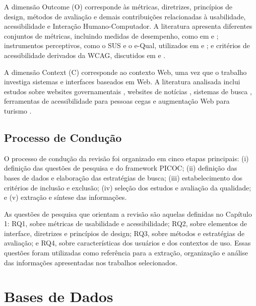 A dimensão Outcome (O) corresponde às métricas, diretrizes, princípios de design, métodos de avaliação e demais contribuições relacionadas à usabilidade, acessibilidade e Interação Humano-Computador. A literatura apresenta diferentes conjuntos de métricas, incluindo medidas de desempenho, como em \cite{weighted_heuristic} e \cite{gatsou2017seniors}; instrumentos perceptivos, como o SUS e o e-Qual, utilizados em \cite{allah2021empathy} e \cite{nosseir2011novice}; e critérios de acessibilidade derivados da WCAG, discutidos em \cite{sun2010preliminary} e \cite{wickramathilaka2023addressing}.

A dimensão Context (C) corresponde ao contexto Web, uma vez que o trabalho investiga sistemas e interfaces baseados em Web. A literatura analisada inclui estudos sobre websites governamentais \cite{health_problem_solving}, websites de notícias \cite{ko2019old}, sistemas de busca \cite{shafiq2018assessment}, ferramentas de acessibilidade para pessoas cegas \cite{kusumaningayu2017web} e augmentação Web para turismo \cite{gonzalez2025augmenting}.



\subsection{Processo de Condução}

\label{sec:conducao}

O processo de condução da revisão foi organizado em cinco etapas principais: (i) definição das questões de pesquisa e do framework PICOC; (ii) definição das bases de dados e elaboração das estratégias de busca; (iii) estabelecimento dos critérios de inclusão e exclusão; (iv) seleção dos estudos e avaliação da qualidade; e (v) extração e síntese das informações.

As questões de pesquisa que orientam a revisão são aquelas definidas no Capítulo 1: RQ1, sobre métricas de usabilidade e acessibilidade; RQ2, sobre elementos de interface, diretrizes e princípios de design; RQ3, sobre métodos e estratégias de avaliação; e RQ4, sobre características dos usuários e dos contextos de uso. Essas questões foram utilizadas como referência para a extração, organização e análise das informações apresentadas nos trabalhos selecionados.

\section{Bases de Dados}

